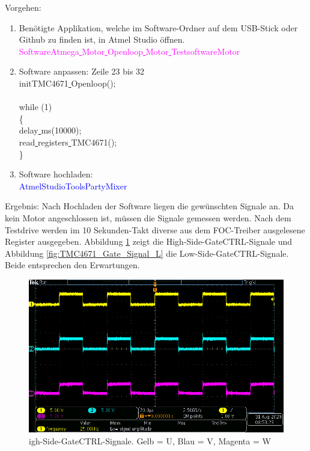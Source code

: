 Vorgehen:
\begin{enumerate}
\item Benötigte Applikation, welche im Software-Ordner auf dem USB-Stick oder Github \cite{aebi_projekt-6softwareatmega_2020} zu finden ist, in Atmel Studio öffnen.\\
\textcolor{magenta}{Software\textrightarrow Atmega\underline{ }Motor\underline{ }Openloop\underline{ }Motor\underline{ }Testsoftware\textrightarrow Motor}\\

\item Software anpassen: Zeile 23 bis 32\\
\textcolor{OliveGreen}{
	initTMC4671\underline{ }Openloop();\\
\\
    while (1) \\
    \{\\
		\underline{ }delay\underline{ }ms(10000);\\
		read\underline{ }registers\underline{ }TMC4671();\\
    \}
}\\

\item Software hochladen:\\
\textcolor{blue}{AtmelStudio\textrightarrow Tools\textrightarrow PartyMixer}\\
\end{enumerate}

Ergebnis: Nach Hochladen der Software liegen die gewünschten Signale an. Da kein Motor angeschlossen ist, müssen die Signale gemessen werden. Nach dem Testdrive werden im 10 Sekunden-Takt diverse aus dem FOC-Treiber ausgelesene Register ausgegeben. Abbildung \ref{fig:TMC4671_Gate_Signal_H} zeigt die High-Side-GateCTRL-Signale und Abbildung \ref{fig:TMC4671_Gate_Signal_L} die Low-Side-GateCTRL-Signale. Beide entsprechen den Erwartungen.

\begin{figure}[H]
\center
\includegraphics[width = \textwidth]{graphics/TMC4671_Gate_Signal_H}
\caption{igh-Side-GateCTRL-Signale. Gelb = U, Blau = V, Magenta = W}
\label{fig:TMC4671_Gate_Signal_H}
\end{figure}

